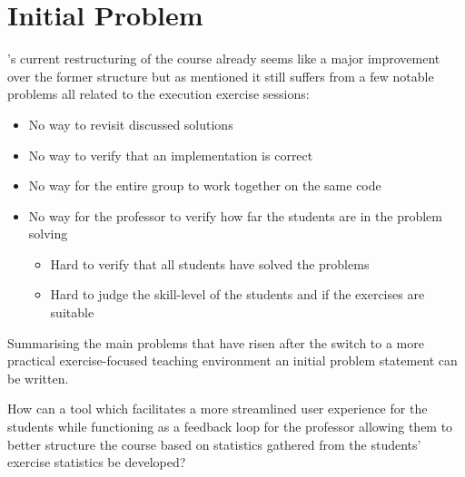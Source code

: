 \section{Initial Problem} \label{sec:Initial Problem}
\aau's current restructuring of the course already seems like a major improvement over the former structure but as mentioned it still suffers from a few notable problems all related to the execution exercise sessions:
\begin{itemize}
	\item No way to revisit discussed solutions
	\item No way to verify that an implementation is correct
	\item No way for the entire group to work together on the same code
	\item No way for the professor to verify how far the students are in the problem solving
	\begin{itemize}
		\item Hard to verify that all students have solved the problems
		\item Hard to judge the skill-level of the students and if the exercises are suitable
	\end{itemize}
\end{itemize}

Summarising the main problems that have risen after the switch to a more practical exercise-focused teaching environment an initial problem statement can be written.
\begin{displayquote}
How can a tool which facilitates a more streamlined user experience for the students while functioning as a feedback loop for the professor allowing them to better structure the course based on statistics gathered from the students' exercise statistics be developed?
\end{displayquote} 

